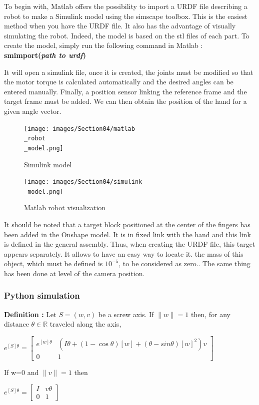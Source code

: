 \hspace{\parindent} To begin with, Matlab offers the possibility to import a URDF file describing a robot to make a Simulink model using the simscape toolbox. This is the easiest method when you have the URDF file. It also has the advantage of visually simulating the robot. Indeed, the model is based on the stl files of each part. To create the model, simply run the following command in Matlab : \textbf{smimport(\textit{path to urdf})}

\bigbreak
It will open a simulink file, once it is created, the joints must be modified so that the motor torque is calculated automatically and the desired angles can be entered manually. Finally, a position sensor linking the reference frame and the target frame must be added. We can then obtain the position of the hand for a given angle vector. 

\bigbreak
\begin{figure}[ht]
    \centering
    \texttt{[image: images/Section04/matlab\\\_robot\\\_model.png]}
    \caption{Simulink model}
    \label{fig:mesh12}
\end{figure}
\FloatBarrier

\bigbreak
\begin{figure}[ht]
    \centering
    \texttt{[image: images/Section04/simulink\\\_model.png]}
    \caption{Matlab robot visualization}
    \label{fig:mesh13}
\end{figure}
\FloatBarrier

\bigbreak
It should be noted that a target block positioned at the center of the fingers has been added in the Onshape model. It is in fixed link with the hand and this link is defined in the general assembly. Thus, when creating the URDF file, this target appears separately. It allows to have an easy way to locate it. the mass of this object, which must be defined is $10^{-5}$, to be considered as zero.. The same thing has been done at level of the camera position. 

\subsubsection{Python simulation}

\textbf{Definition :} Let $S = (w,v)$ be a screw axis. If $\|w\|=1$ then, for any distance $\theta\in\mathbb{R}$ traveled along the axis,
\begin{center}
    $e^{[S]\theta}=
    \begin{bmatrix}
        e^{[w]\theta} & (I\theta+(1-\cos\theta)[w]+(\theta-sin\theta)[w]^2)v\\
        0 & 1
    \end{bmatrix}$
\end{center}
If w=0 and $\|v\|=1$ then 
\begin{center}
    $e^{[S]\theta}=\begin{bmatrix}
        I & v\theta\\
        0 & 1
    \end{bmatrix}$
\end{center}

